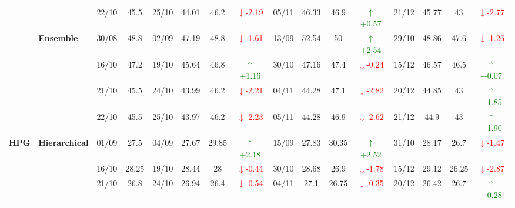 {\begin{longtable}{llcc|cccc|cccc|cccc}
&
& 22/10 & 45.5 & 25/10 & 44.01 & 46.2 & \textcolor{red}{\(\downarrow\)-2.19} & 05/11 & 46.33 & 46.9 & \textcolor{green}{\(\uparrow\)+0.57} & 21/12 & 45.77 & 43 & \textcolor{red}{\(\downarrow\)-2.77} \\
\cmidrule(lr){2-16}



& \textbf{Ensemble}
& 30/08 & 48.8 & 02/09 & 47.19 & 48.8 & \textcolor{red}{\(\downarrow\)-1.61} & 13/09 & 52.54 & 50 & \textcolor{green}{\(\uparrow\)+2.54} & 29/10 & 48.86 & 47.6 & \textcolor{red}{\(\downarrow\)-1.26} \\

&
& 16/10 & 47.2 & 19/10 & 45.64 & 46.8 & \textcolor{green}{\(\uparrow\)+1.16} & 30/10 & 47.16 & 47.4 & \textcolor{red}{\(\downarrow\)-0.24} & 15/12 & 46.57 & 46.5 & \textcolor{green}{\(\uparrow\)+0.07} \\

&
& 21/10 & 45.5 & 24/10 & 43.99 & 46.2 & \textcolor{red}{\(\downarrow\)-2.21} & 04/11 & 44.28 & 47.1 & \textcolor{red}{\(\downarrow\)-2.82} & 20/12 & 44.85 & 43 & \textcolor{green}{\(\uparrow\)+1.85} \\

&
& 22/10 & 45.5 & 25/10 & 43.97 & 46.2 & \textcolor{red}{\(\downarrow\)-2.23} & 05/11 & 44.28 & 46.9 & \textcolor{red}{\(\downarrow\)-2.62} & 21/12 & 44.9 & 43 & \textcolor{green}{\(\uparrow\)+1.90} \\
\midrule


\multirow{12}{*}{\textbf{HPG}} 
& \textbf{Hierarchical}
& 01/09 & 27.5 & 04/09 & 27.67 & 29.85 & \textcolor{green}{\(\uparrow\)+2.18} & 15/09 & 27.83 & 30.35 & \textcolor{green}{\(\uparrow\)+2.52} & 31/10 & 28.17 & 26.7 & \textcolor{red}{\(\downarrow\)-1.47} \\

& 
& 16/10 & 28.25 & 19/10 & 28.44 & 28 & \textcolor{red}{\(\downarrow\)-0.44} & 30/10 & 28.68 & 26.9 & \textcolor{red}{\(\downarrow\)-1.78} & 15/12 & 29.12 & 26.25 & \textcolor{red}{\(\downarrow\)-2.87} \\

& 
& 21/10 & 26.8 & 24/10 & 26.94 & 26.4 & \textcolor{red}{\(\downarrow\)-0.54} & 04/11 & 27.1 & 26.75 & \textcolor{red}{\(\downarrow\)-0.35} & 20/12 & 26.42 & 26.7 & \textcolor{green}{\(\uparrow\)+0.28} \\


\end{longtable}}
